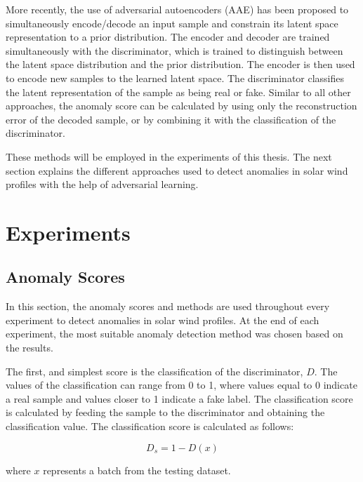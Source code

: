 More recently, the use of adversarial autoencoders (AAE) has been proposed \cite{zenati.etal_AdversariallyLearnedAnomaly_2018,wang.etal_AdVAESelfadversarialVariational_2020} to simultaneously encode/decode an input sample and constrain its latent space representation to a prior distribution. The encoder and decoder are trained simultaneously with the discriminator, which is trained to distinguish between the latent space distribution and the prior distribution. The encoder is then used to encode new samples to the learned latent space. The discriminator classifies the latent representation of the sample as being real or fake. Similar to all other approaches, the anomaly score can be calculated by using only the reconstruction error of the decoded sample, or by combining it with the classification of the discriminator.

These methods will be employed in the experiments of this thesis. The next section explains the different approaches used to detect anomalies in solar wind profiles with the help of adversarial learning.

\section{Experiments}\label{sec:gan_experiments}
\subsection{Anomaly Scores}\label{sec:gan_anomaly_scores}
In this section, the anomaly scores and methods are used throughout every experiment to detect anomalies in solar wind profiles. At the end of each experiment, the most suitable anomaly detection method was chosen based on the results.

The first, and simplest score is the classification of the discriminator, $D$. The values of the classification can range from 0 to 1, where values equal to 0 indicate a real sample and values closer to 1 indicate a fake label. The classification score is calculated by feeding the sample to the discriminator and obtaining the classification value. The classification score is calculated as follows:

\begin{equation}
    D_{s} = 1 - D(x)
\end{equation}

where $x$ represents a batch from the testing dataset.

